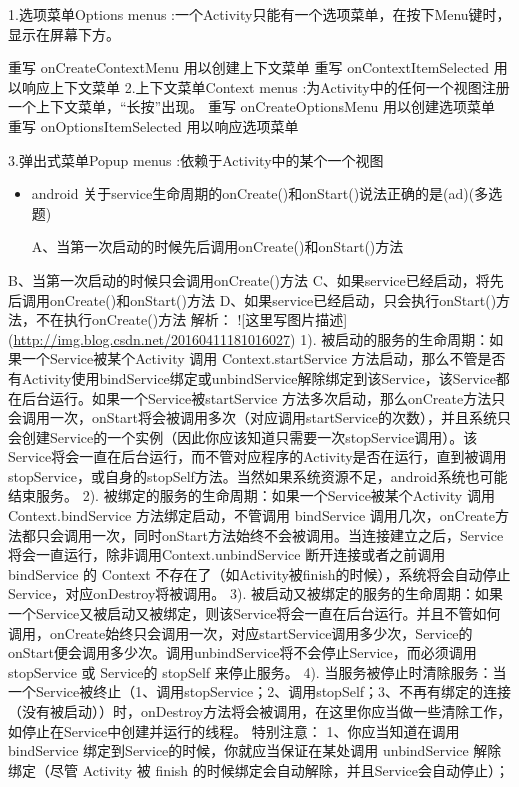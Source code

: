 \documentclass[9pt, b5paper]{article}
\begin{document}
1.选项菜单Options menus :一个Activity只能有一个选项菜单，在按下Menu键时，显示在屏幕下方。

    重写 onCreateContextMenu 用以创建上下文菜单 
    重写 onContextItemSelected 用以响应上下文菜单  
2.上下文菜单Context menus :为Activity中的任何一个视图注册一个上下文菜单，“长按”出现。
    重写 onCreateOptionsMenu 用以创建选项菜单 
    重写 onOptionsItemSelected 用以响应选项菜单 

3.弹出式菜单Popup menus :依赖于Activity中的某个一个视图
\begin{itemize}
\item android 关于service生命周期的onCreate()和onStart()说法正确的是(ad)(多选题)

A、当第一次启动的时候先后调用onCreate()和onStart()方法
\end{itemize}
B、当第一次启动的时候只会调用onCreate()方法
C、如果service已经启动，将先后调用onCreate()和onStart()方法
D、如果service已经启动，只会执行onStart()方法，不在执行onCreate()方法
    解析：
![这里写图片描述](\url{http://img.blog.csdn.net/20160411181016027})
1). 被启动的服务的生命周期：如果一个Service被某个Activity 调用 Context.startService 方法启动，那么不管是否有Activity使用bindService绑定或unbindService解除绑定到该Service，该Service都在后台运行。如果一个Service被startService 方法多次启动，那么onCreate方法只会调用一次，onStart将会被调用多次（对应调用startService的次数），并且系统只会创建Service的一个实例（因此你应该知道只需要一次stopService调用）。该Service将会一直在后台运行，而不管对应程序的Activity是否在运行，直到被调用stopService，或自身的stopSelf方法。当然如果系统资源不足，android系统也可能结束服务。
2). 被绑定的服务的生命周期：如果一个Service被某个Activity 调用 Context.bindService 方法绑定启动，不管调用 bindService 调用几次，onCreate方法都只会调用一次，同时onStart方法始终不会被调用。当连接建立之后，Service将会一直运行，除非调用Context.unbindService 断开连接或者之前调用bindService 的 Context 不存在了（如Activity被finish的时候），系统将会自动停止Service，对应onDestroy将被调用。
3). 被启动又被绑定的服务的生命周期：如果一个Service又被启动又被绑定，则该Service将会一直在后台运行。并且不管如何调用，onCreate始终只会调用一次，对应startService调用多少次，Service的onStart便会调用多少次。调用unbindService将不会停止Service，而必须调用 stopService 或 Service的 stopSelf 来停止服务。
4). 当服务被停止时清除服务：当一个Service被终止（1、调用stopService；2、调用stopSelf；3、不再有绑定的连接（没有被启动））时，onDestroy方法将会被调用，在这里你应当做一些清除工作，如停止在Service中创建并运行的线程。
特别注意：
1、你应当知道在调用 bindService 绑定到Service的时候，你就应当保证在某处调用 unbindService 解除绑定（尽管 Activity 被 finish 的时候绑定会自动解除，并且Service会自动停止）；
\end{document}
